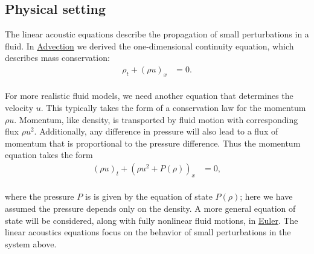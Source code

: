 \documentclass[11pt]{article}
\begin{document}
    \hypertarget{physical-setting}{%
\subsection{Physical setting}\label{physical-setting}}

The linear acoustic equations describe the propagation of small
perturbations in a fluid. In \href{Advection.ipynb}{Advection} we
derived the one-dimensional continuity equation, which describes mass
conservation:\\
\begin{align} \label{Ac:continuity}
    \rho_t + (\rho u)_x & = 0.
\end{align}\\
For more realistic fluid models, we need another equation that
determines the velocity \(u\). This typically takes the form of a
conservation law for the momentum \(\rho u\). Momentum, like density, is
transported by fluid motion with corresponding flux \(\rho u^2\).
Additionally, any difference in pressure will also lead to a flux of
momentum that is proportional to the pressure difference. Thus the
momentum equation takes the form\\
\begin{align} \label{Ac:mom_cons}
(\rho u)_t + (\rho u^2 + P(\rho))_x & = 0,
\end{align}\\
where the pressure \(P\) is is given by the equation of state
\(P(\rho)\); here we have assumed the pressure depends only on the
density. A more general equation of state will be considered, along with
fully nonlinear fluid motions, in \href{Euler.ipynb}{Euler}. The linear
acoustics equations focus on the behavior of small perturbations in the
system above.
\end{document}

